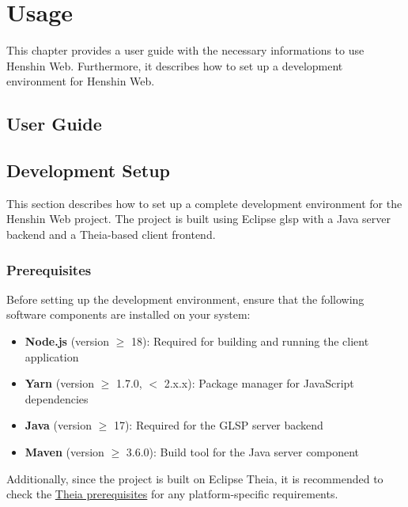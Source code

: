 \chapter{Usage}
\label{chap:usage}

This chapter provides a user guide with the necessary informations to use Henshin Web. Furthermore, it describes how to set up a development environment for Henshin Web.

\section{User Guide}
\label{sec:user_guide}



\section{Development Setup}
\label{sec:dev_setup}

This section describes how to set up a complete development environment for the Henshin Web project. The project is built using Eclipse \ac{glsp} with a Java server backend and a Theia-based client frontend.

\subsection{Prerequisites}
\label{subsec:prerequisites}

Before setting up the development environment, ensure that the following software components are installed on your system:

\begin{itemize}
    \item \textbf{Node.js} (version $\geq$ 18): Required for building and running the client application
    \item \textbf{Yarn} (version $\geq$ 1.7.0, $<$ 2.x.x): Package manager for JavaScript dependencies
    \item \textbf{Java} (version $\geq$ 17): Required for the GLSP server backend
    \item \textbf{Maven} (version $\geq$ 3.6.0): Build tool for the Java server component
\end{itemize}

Additionally, since the project is built on Eclipse Theia, it is recommended to check the \href{https://github.com/eclipse-theia/theia/blob/master/doc/Developing.md\#prerequisites}{Theia prerequisites} for any platform-specific requirements.

